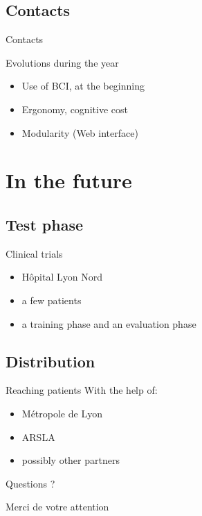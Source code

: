 \documentclass[notes]{beamer}
\begin{document}
\subsection{Contacts}
\begin{frame}{Contacts}
	\begin{center}
	\end{center}
\end{frame}

\begin{frame}{Evolutions during the year}
	\begin{center}
		\begin{itemize}
			\item Use of BCI, at the beginning
			\item Ergonomy, cognitive cost %
			\item Modularity (Web interface)
		\end{itemize}
	\end{center}
\end{frame}

\section{In the future}
\subsection{Test phase}
\begin{frame}{Clinical trials}
	\begin{center}
		\begin{itemize}
			\item Hôpital Lyon Nord %
			\item a few patients
			\item a training phase and an evaluation phase %
		\end{itemize}
	\end{center}
\end{frame}

\subsection{Distribution}
\begin{frame}{Reaching patients}
	With the help of: 
	\begin{itemize}
		\item Métropole de Lyon
		\item ARSLA
		\item possibly other partners %
	\end{itemize}
\end{frame}

\begin{frame}{Questions ?}
	\begin{center}
		Merci de votre attention
	\end{center}
\end{frame}
\end{document}
